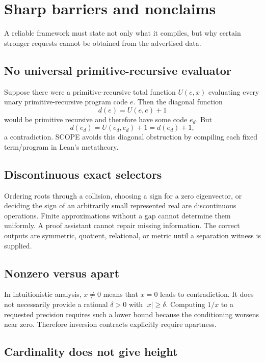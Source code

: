 \section{Sharp barriers and nonclaims}

A reliable framework must state not only what it compiles, but why certain stronger requests cannot be obtained from the advertised data.

\subsection{No universal primitive-recursive evaluator}

Suppose there were a primitive-recursive total function \(U(e,x)\) evaluating every unary primitive-recursive program code \(e\).  Then the diagonal function
\[
  d(e)=U(e,e)+1
\]
would be primitive recursive and therefore have some code \(e_d\).  But
\[
  d(e_d)=U(e_d,e_d)+1=d(e_d)+1,
\]
a contradiction.  SCOPE avoids this diagonal obstruction by compiling each fixed term/program in Lean's metatheory.

\subsection{Discontinuous exact selectors}

Ordering roots through a collision, choosing a sign for a zero eigenvector, or deciding the sign of an arbitrarily small represented real are discontinuous operations.  Finite approximations without a gap cannot determine them uniformly.  A proof assistant cannot repair missing information.  The correct outputs are symmetric, quotient, relational, or metric until a separation witness is supplied.

\subsection{Nonzero versus apart}

In intuitionistic analysis, \(x\ne0\) means that \(x=0\) leads to contradiction.  It does not necessarily provide a rational \(\delta>0\) with \(|x|\ge\delta\).  Computing \(1/x\) to a requested precision requires such a lower bound because the conditioning worsens near zero.  Therefore inversion contracts explicitly require apartness.

\subsection{Cardinality does not give height}

